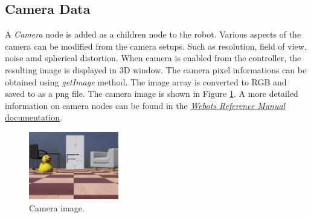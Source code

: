 \documentclass[11pt]{article}
\begin{document}
    \subsection{Camera Data}
    A \emph{Camera} node is added as a children node to the robot. Various aspects of the camera can be modified from the camera setups. Such as resolution, field of view, noise amd spherical distortion. When camera is enabled from the controller, the resulting image is displayed in 3D window.
    The camera pixel informations can be obtained using \emph{getImage} method. The image array is converted to RGB and saved to as a png file. The camera image is shown in Figure \ref{fig:camera}. A more detailed information on camera nodes can be found in the \href{https://cyberbotics.com/doc/reference/camera}{\emph{Webots Reference Manual} documentation}.
   
    \begin{figure}[ht!]
        \centering
        \includegraphics[width = 0.35\textwidth]{camera.jpg}
        \caption{Camera image.}
        \label{fig:camera}
    \end{figure}
\end{document}
